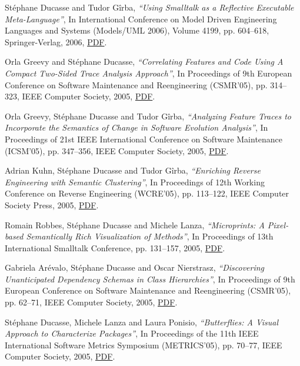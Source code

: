 \documentclass{article}
\newcommand{\czauthors}[1]{#1}
\newcommand{\cztitle}[1]{\emph{``#1''}}
\newcommand{\czbooktitle}[1]{#1}
\begin{document}
\begin{itemize}
	\pub  \czauthors{St\'ephane Ducasse and Tudor G\^irba},  \cztitle{Using {Smalltalk} as a Reflective Executable Meta-Language},  In \czbooktitle{International Conference on Model Driven Engineering Languages and Systems (Models/UML 2006)}, Volume 4199, pp. 604--618, Springer-Verlag, 2006, \href{http://rmod-files.lille.inria.fr/Team/Texts/Papers/Duca06dMOOSEMODELS2006.pdf}{PDF}.

	\pub  \czauthors{Orla Greevy and St\'ephane Ducasse},  \cztitle{Correlating Features and Code Using A Compact Two-Sided Trace Analysis Approach},  In \czbooktitle{Proceedings of 9th European Conference on Software Maintenance and Reengineering (CSMR'05)}, pp. 314--323, IEEE Computer Society, 2005, \href{http://rmod-files.lille.inria.fr/Team/Texts/Papers/Gree05aTraceScraperCSMR2005Features.pdf}{PDF}.

	\pub  \czauthors{Orla Greevy, St\'ephane Ducasse and Tudor G\^irba},  \cztitle{Analyzing Feature Traces to Incorporate the Semantics of Change in Software Evolution Analysis},  In \czbooktitle{Proceedings of 21st IEEE International Conference on Software Maintenance (ICSM'05)}, pp. 347--356, IEEE Computer Society, 2005, \href{http://rmod-files.lille.inria.fr/Team/Texts/Papers/Gree05cTraceScraperICSM2005.pdf}{PDF}.

	\pub  \czauthors{Adrian Kuhn, St\'ephane Ducasse and Tudor G\^irba},  \cztitle{Enriching Reverse Engineering with Semantic Clustering},  In \czbooktitle{Proceedings of 12th Working Conference on Reverse Engineering (WCRE'05)}, pp. 113--122, IEEE Computer Society Press, 2005, \href{http://rmod-files.lille.inria.fr/Team/Texts/Papers/Kuhn05aSemanticClustering.pdf}{PDF}.

	\pub  \czauthors{Romain Robbes, St\'ephane Ducasse and Michele Lanza},  \cztitle{Microprints: A Pixel-based Semantically Rich Visualization of Methods},  In \czbooktitle{Proceedings of 13th International Smalltalk Conference}, pp. 131--157, 2005, \href{http://rmod-files.lille.inria.fr/Team/Texts/Papers/Robb05b-microprintsESUG.pdf}{PDF}.

	\pub  \czauthors{Gabriela Ar{\'e}valo, St\'ephane Ducasse and Oscar Nierstrasz},  \cztitle{Discovering Unanticipated Dependency Schemas in Class Hierarchies},  In \czbooktitle{Proceedings of 9th European Conference on Software Maintenance and Reengineering (CSMR'05)}, pp. 62--71, IEEE Computer Society, 2005, \href{http://rmod-files.lille.inria.fr/Team/Texts/Papers/Arev05b-CSMR05-ClassHierarchies.pdf}{PDF}.

	\pub  \czauthors{St\'ephane Ducasse, Michele Lanza and Laura Ponisio},  \cztitle{Butterflies: A Visual Approach to Characterize Packages},  In \czbooktitle{Proceedings of the 11th IEEE International Software Metrics Symposium (METRICS'05)}, pp. 70--77, IEEE Computer Society, 2005, \href{http://rmod-files.lille.inria.fr/Team/Texts/Papers/Duca05e-Metrics-Butterflies-Ponisio.pdf}{PDF}.


\end{itemize}
\end{document}

